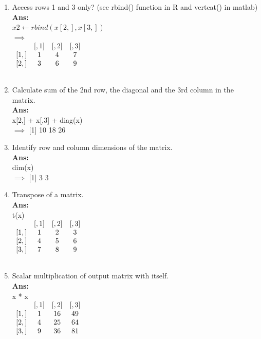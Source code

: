 \documentclass[fontsize=10pt]{scrartcl}
\begin{document}
\begin{enumerate}
\begin{enumerate}
				\item
				Access rows 1 and 3 only? (see rbind() function in R and vertcat() in matlab) \\
				\textbf{Ans:} \\
				$x2 \leftarrow rbind(x[2,],x[3,])$ \\
				$\implies$ \\
				$\begin{array}{cccc}
					~		&	[,1]	&	[,2]	&	[,3]	\\ \relax
					[1,]	&	1		&	4		&	7		\\ \relax
					[2,]	&	3		&	6		&	9		\\ \relax
				\end{array}$

				\item
				Calculate sum of the 2nd row, the diagonal and the 3rd column in the matrix. \\
				\textbf{Ans:} \\
				x[2,] + x[,3] + diag(x) \\
				$\implies$  [1] 10 18 26 \\

				\item
				Identify row and column dimensions of the matrix.\\
				\textbf{Ans:} \\
				dim(x) \\
				$\implies$ [1] 3 3 \\

				\item
				Transpose of a matrix. \\
				\textbf{Ans:} \\
				t(x) \\
				$\begin{array}{cccc}
				~		&	[,1]	&	[,2]	&	[,3]	\\ \relax
				[1,]	&	1		&	2		&	3		\\ \relax
				[2,]	&	4		&	5		&	6		\\ \relax
				[3,]	&	7		&	8		&	9		\\ \relax
				\end{array}$

				\item
				Scalar multiplication of output matrix with itself. \\
				\textbf{Ans:} \\
				x * x \\
				$\begin{array}{cccc}
				~		&	[,1]	&	[,2]	&	[,3]	\\ \relax
				[1,]	&	1		&	16		&	49		\\ \relax
				[2,]	&	4		&	25		&	64		\\ \relax
				[3,]	&	9		&	36		&	81		\\ \relax
				\end{array}$


\end{enumerate}
\end{enumerate}
\end{document}
